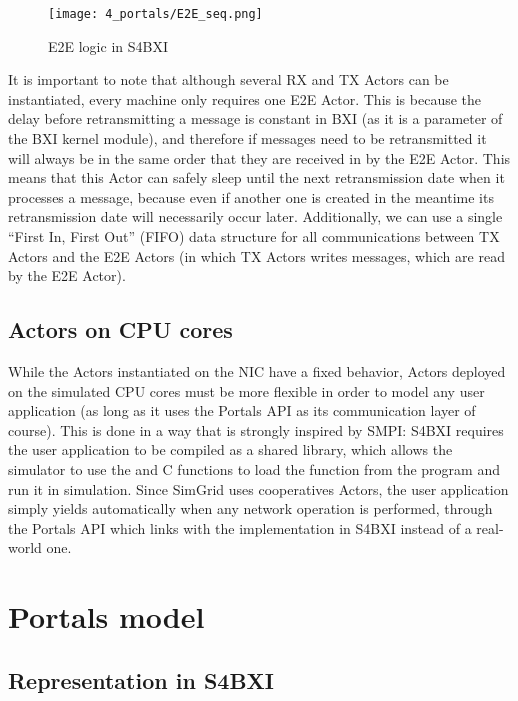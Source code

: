 \begin{figure}[!ht]
    \centering
    \texttt{[image: 4\_portals/E2E\_seq.png]}
    \caption{E2E logic in S4BXI}
    \label{fig:4_portals:e2e_logic}
\end{figure}

It is important to note that although several RX and TX Actors can be
instantiated, every machine only requires one E2E Actor. This is because the
delay before retransmitting a message is constant in BXI (as it is a parameter
of the BXI kernel module), and therefore if messages need to be retransmitted it
will always be in the same order that they are received in by the E2E Actor.
This means that this Actor can safely sleep until the next retransmission date
when it processes a message, because even if another one is created in the
meantime its retransmission date will necessarily occur later. Additionally, we
can use a single ``First In, First Out'' (FIFO) data structure for all
communications between TX Actors and the E2E Actors (in which TX Actors writes
messages, which are read by the E2E Actor).

\subsection{Actors on CPU cores}
\label{subsec:4_portals:UserAppActors}

While the Actors instantiated on the NIC have a fixed behavior, Actors deployed
on the simulated CPU cores must be more flexible in order to model any user
application (as long as it uses the Portals API as its communication layer of
course). This is done in a way that is strongly inspired by SMPI: S4BXI requires
the user application to be compiled as a shared library, which allows the
simulator to use the  and  C functions to
load the  function from the program and run it in simulation.
Since SimGrid uses cooperatives Actors, the user application simply yields
automatically when any network operation is performed, through the Portals API
which links with the implementation in S4BXI instead of a real-world one.

\section{Portals model}

\subsection{Representation in S4BXI}

